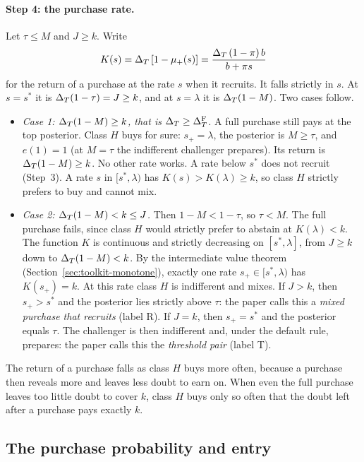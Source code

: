 \paragraph{Step 4: the purchase rate.} Let \(\tau\le M\) and \(J\ge k\). Write
\[
K(s)=\Delta_T\,[1-\mu_+(s)]=\frac{\Delta_T\,(1-\pi)\,b}{b+\pi s}
\]
for the return of a purchase at the rate \(s\) when it recruits. It falls strictly in \(s\). At \(s=s^*\) it is
\(\Delta_T(1-\tau)=J\ge k\), and at \(s=\lambda\) it is \(\Delta_T(1-M)\). Two cases follow.
\begin{itemize}
\item \emph{Case 1: \(\Delta_T(1-M)\ge k\), that is \(\Delta_T\ge\Delta_T^{\rm F}\).} A full purchase still pays at the top
posterior. Class \(H\) buys for sure: \(s_+=\lambda\), the posterior is \(M\ge\tau\), and \(e(1)=1\) (at \(M=\tau\)
the indifferent challenger prepares). Its return is \(\Delta_T(1-M)\ge k\). No other rate works. A rate below \(s^*\)
does not recruit (Step~3). A rate \(s\) in \([s^*,\lambda)\) has \(K(s)>K(\lambda)\ge k\), so class \(H\) strictly
prefers to buy and cannot mix.
\item \emph{Case 2: \(\Delta_T(1-M)<k\le J\).} Then \(1-M<1-\tau\), so \(\tau<M\). The full purchase fails, since class
\(H\) would strictly prefer to abstain at \(K(\lambda)<k\). The function \(K\) is continuous and strictly decreasing
on \([s^*,\lambda]\), from \(J\ge k\) down to \(\Delta_T(1-M)<k\). By the intermediate value theorem
(Section~\ref{sec:toolkit-monotone}), exactly one rate \(s_+\in[s^*,\lambda)\) has \(K(s_+)=k\). At this rate class
\(H\) is indifferent and mixes. If \(J>k\), then \(s_+>s^*\) and the posterior lies strictly above \(\tau\): the paper
calls this a \emph{mixed purchase that recruits} (label R). If \(J=k\), then \(s_+=s^*\) and the posterior equals
\(\tau\). The challenger is then indifferent and, under the default rule, prepares: the paper calls this the
\emph{threshold pair} (label T).
\end{itemize}

\begin{intuition}
The return of a purchase falls as class \(H\) buys more often, because a purchase then reveals more and leaves less
doubt to earn on. When even the full purchase leaves too little doubt to cover \(k\), class \(H\) buys only so often
that the doubt left after a purchase pays exactly \(k\).
\end{intuition}

\subsection{The purchase probability and entry}

